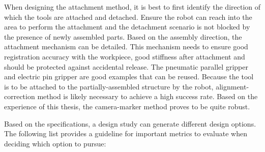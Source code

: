 When designing the attachment method, it is best to first identify the direction of which the tools are attached and detached. Ensure the robot can reach into the area to perform the attachment and the detachment scenario is not blocked by the presence of newly assembled parts. Based on the assembly direction, the attachment mechanism can be detailed. This mechanism needs to ensure good registration accuracy with the workpiece, good stiffness after attachment and should be protected against accidental release. The pneumatic parallel gripper and electric pin gripper are good examples that can be reused. Because the tool is to be attached to the partially-assembled structure by the robot, alignment-correction method is likely necessary to achieve a high success rate. Based on the experience of this thesis, the camera-marker method proves to be quite robust. 

Based on the specifications, a design study can generate different design options. The following list provides a guideline for important metrics to evaluate when deciding which option to pursue:

